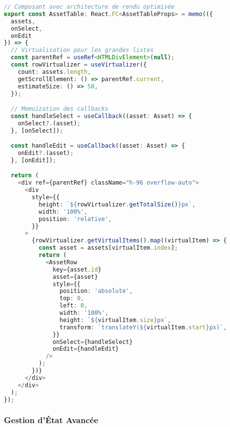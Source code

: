 \documentclass[12pt,a4paper]{report}
\begin{document}
\begin{lstlisting}[language=TypeScript, caption=Architecture de composants avancée]
// Composant avec architecture de rendu optimisée
export const AssetTable: React.FC<AssetTableProps> = memo(({ 
  assets, 
  onSelect, 
  onEdit 
}) => {
  // Virtualisation pour les grandes listes
  const parentRef = useRef<HTMLDivElement>(null);
  const rowVirtualizer = useVirtualizer({
    count: assets.length,
    getScrollElement: () => parentRef.current,
    estimateSize: () => 50,
  });

  // Memoization des callbacks
  const handleSelect = useCallback((asset: Asset) => {
    onSelect?.(asset);
  }, [onSelect]);

  const handleEdit = useCallback((asset: Asset) => {
    onEdit?.(asset);
  }, [onEdit]);

  return (
    <div ref={parentRef} className="h-96 overflow-auto">
      <div
        style={{
          height: `${rowVirtualizer.getTotalSize()}px`,
          width: '100%',
          position: 'relative',
        }}
      >
        {rowVirtualizer.getVirtualItems().map((virtualItem) => {
          const asset = assets[virtualItem.index];
          return (
            <AssetRow
              key={asset.id}
              asset={asset}
              style={{
                position: 'absolute',
                top: 0,
                left: 0,
                width: '100%',
                height: `${virtualItem.size}px`,
                transform: `translateY(${virtualItem.start}px)`,
              }}
              onSelect={handleSelect}
              onEdit={handleEdit}
            />
          );
        })}
      </div>
    </div>
  );
});
\end{lstlisting}

\subsubsection{Gestion d'État Avancée}
\end{document}
